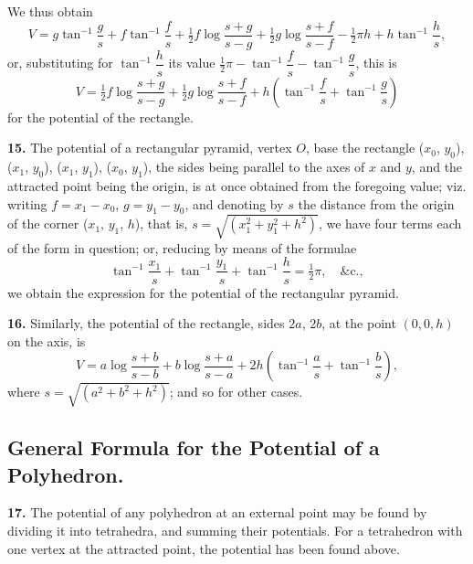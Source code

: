 \documentclass[11pt,a4paper]{article}
\begin{document}
We thus obtain
\[
V = g\tan^{-1}\frac{g}{s} + f\tan^{-1}\frac{f}{s}
  + \tfrac{1}{2}f\log\frac{s+g}{s-g} + \tfrac{1}{2}g\log\frac{s+f}{s-f}
  - \tfrac{1}{2}\pi h + h\tan^{-1}\frac{h}{s},
\]
or, substituting for $\tan^{-1}\dfrac{h}{s}$ its value
$\tfrac{1}{2}\pi - \tan^{-1}\dfrac{f}{s} - \tan^{-1}\dfrac{g}{s}$, this is
\[
V = \tfrac{1}{2}f\log\frac{s+g}{s-g} + \tfrac{1}{2}g\log\frac{s+f}{s-f}
  + h\left(\tan^{-1}\frac{f}{s} + \tan^{-1}\frac{g}{s}\right)
\]
for the potential of the rectangle.

\newpage
\noindent\textbf{15.}\quad
The potential of a rectangular pyramid, vertex $O$, base the rectangle
($x_0$, $y_0$), ($x_1$, $y_0$), ($x_1$, $y_1$), ($x_0$, $y_1$), the sides being
parallel to the axes of $x$ and $y$, and the attracted point being the
origin, is at once obtained from the foregoing value; viz. writing
$f=x_1-x_0$, $g=y_1-y_0$, and denoting by $s$ the distance from the origin
of the corner ($x_1$, $y_1$, $h$), that is, $s=\sqrt{(x_1^2+y_1^2+h^2)}$, we
have four terms each of the form in question; or, reducing by means of the
formulae
\[
\tan^{-1}\frac{x_1}{s} + \tan^{-1}\frac{y_1}{s} + \tan^{-1}\frac{h}{s}
= \tfrac{1}{2}\pi, \quad \&\text{c.},
\]
we obtain the expression for the potential of the rectangular pyramid.

\smallskip\noindent\textbf{16.}\quad
Similarly, the potential of the rectangle, sides $2a$, $2b$, at the point
$(0,0,h)$ on the axis, is
\[
V = a\log\frac{s+b}{s-b} + b\log\frac{s+a}{s-a}
  + 2h\left(\tan^{-1}\frac{a}{s} + \tan^{-1}\frac{b}{s}\right),
\]
where $s=\sqrt{(a^2+b^2+h^2)}$; and so for other cases.

\subsection*{General Formula for the Potential of a Polyhedron.}

\smallskip\noindent\textbf{17.}\quad
The potential of any polyhedron at an external point may be found by
dividing it into tetrahedra, and summing their potentials. For a tetrahedron
with one vertex at the attracted point, the potential has been found above.
\end{document}

